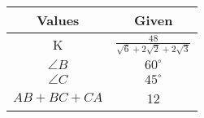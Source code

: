 \begin{tabular}[12pt]{ |c| c|}
    \hline
    \textbf{Values} & \textbf{Given}\\ 
    \hline
     K  & $\frac{48}{\sqrt{6}+2\sqrt{2}+2\sqrt{3}}$ \\
    \hline 
     $\angle{B}$ & $60^\circ$\\
    \hline
     $\angle{C}$& $45^\circ$\\
    \hline
    $AB+BC+CA$ & 12 \\
    \hline 
    \end{tabular}

